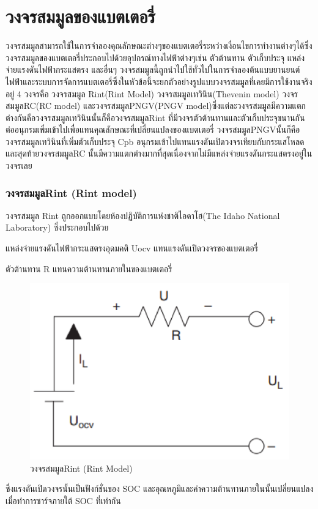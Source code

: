 \section{วงจรสมมูลของแบตเตอรี่}
	วงจรสมมูลสามารถใช้ในการจำลองคุณลักษณะต่างๆของแบตเตอรี่ระหว่างเงื่อนไขการทำงานต่างๆได้ซึ่งวงจรสมมูลของแบตเตอรี่ประกอบไปด้วยอุปกรณ์ทางไฟฟ้าต่างๆเช่น ตัวต้านทาน ตัวเก็บประจุ แหล่งจ่ายแรงดันไฟฟ้ากระแสตรง และอื่นๆ วงจรสมมูลนี้ถูกนำไปใช้ทั่วไปในการจำลองต้นแบบยานยนต์ไฟฟ้าและระบบการจัดการแบตเตอรี่ซึ่งในหัวข้อนี้จะยกตัวอย่างรูปแบบวงจรสมมูลที่เคยมีการใช้งานจริงอยู่ 4 วงจรคือ วงจรสมมูล Rint(Rint Model) วงจรสมมูลเทวินิน(Thevenin model) วงจรสมมูลRC(RC model) และวงจรสมมูลPNGV(PNGV model)ซึ่งแต่ละวงจรสมมูลมีความแตกต่างกันคือวงจรสมมูลเทวินินนั้นก็คือวงจรสมมูลRint ที่มีวงจรตัวต้านทานและตัวเก็บประจุขนานกันต่ออนุกรมเพิ่มเข้าไปเพื่อแทนคุณลักษณะที่เปลี่ยนแปลงของแบตเตอรี่ วงจรสมมูลPNGVนั้นก็คือวงจรสมมูลเทวินินที่เพิ่มตัวเก็บประจุ Cpb อนุกรมเข้าไปแทนแรงดันเปิดวงจรเทียบกับกระแสโหลด และสุดท้ายวงจรสมมูลRC นั้นมีความแตกต่างมากที่สุดเนื่องจากไม่มีแหล่งจ่ายแรงดันกระแสตรงอยู่ในวงจรเลย
\subsubsection*{วงจรสมมูลRint (Rint model)}
วงจรสมมูล Rint ถูกออกแบบโดยห้องปฏิบัติการแห่งชาติไอดาโฮ(The Idaho National Laboratory) ซึ่งประกอบไปด้วย
\begin{itemize}
{\item แหล่งจ่ายแรงดันไฟฟ้ากระแสตรงอุดมคติ Uocv แทนแรงดันเปิดวงจรของแบตเตอรี่}
{\item ตัวต้านทาน R แทนความต้านทานภายในของแบตเตอรี่}
\end{itemize}
\begin{center}
	\begin{figure}[H]
		\includegraphics[width=0.6\linewidth]{Chapters/img/Rint_model.png}
			\centering
			\captionsetup{justification=centering,margin=2cm}
			\caption{วงจรสมมูลRint (Rint Model)}
	\end{figure}
\end{center}
ซึ่งแรงดันเปิดวงจรนั้นเป็นฟังก์ชั่นของ SOC และอุณหภูมิและค่าความต้านทานภายในนั้นเปลี่ยนแปลงเมื่อทำการชาร์จภายใต้ SOC ที่เท่ากัน
